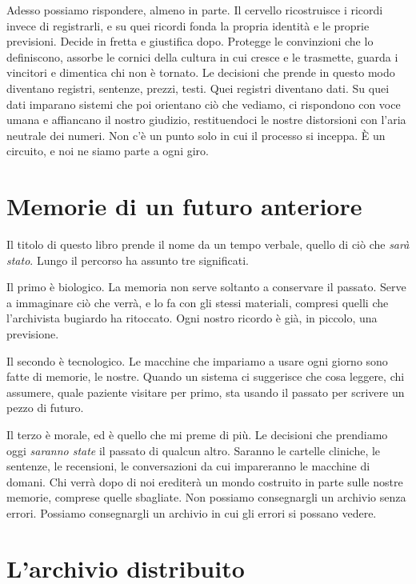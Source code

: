 Adesso possiamo rispondere, almeno in parte. Il cervello ricostruisce i ricordi invece di registrarli, e su quei ricordi fonda la propria identità e le proprie previsioni. Decide in fretta e giustifica dopo. Protegge le convinzioni che lo definiscono, assorbe le cornici della cultura in cui cresce e le trasmette, guarda i vincitori e dimentica chi non è tornato. Le decisioni che prende in questo modo diventano registri, sentenze, prezzi, testi. Quei registri diventano dati. Su quei dati imparano sistemi che poi orientano ciò che vediamo, ci rispondono con voce umana e affiancano il nostro giudizio, restituendoci le nostre distorsioni con l'aria neutrale dei numeri. Non c'è un punto solo in cui il processo si inceppa. È un circuito, e noi ne siamo parte a ogni giro.

\section*{Memorie di un futuro anteriore}

Il titolo di questo libro prende il nome da un tempo verbale, quello di ciò che \textit{sarà stato}. Lungo il percorso ha assunto tre significati.

Il primo è biologico. La memoria non serve soltanto a conservare il passato. Serve a immaginare ciò che verrà, e lo fa con gli stessi materiali, compresi quelli che l'archivista bugiardo ha ritoccato. Ogni nostro ricordo è già, in piccolo, una previsione.

Il secondo è tecnologico. Le macchine che impariamo a usare ogni giorno sono fatte di memorie, le nostre. Quando un sistema ci suggerisce che cosa leggere, chi assumere, quale paziente visitare per primo, sta usando il passato per scrivere un pezzo di futuro.

Il terzo è morale, ed è quello che mi preme di più. Le decisioni che prendiamo oggi \textit{saranno state} il passato di qualcun altro. Saranno le cartelle cliniche, le sentenze, le recensioni, le conversazioni da cui impareranno le macchine di domani. Chi verrà dopo di noi erediterà un mondo costruito in parte sulle nostre memorie, comprese quelle sbagliate. Non possiamo consegnargli un archivio senza errori. Possiamo consegnargli un archivio in cui gli errori si possano vedere.

\section*{L'archivio distribuito}

